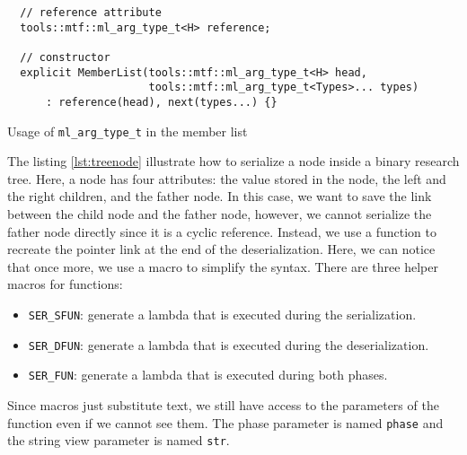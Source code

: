 \begin{listing}[ht!]
\begin{verbatim}
  // reference attribute
  tools::mtf::ml_arg_type_t<H> reference;

  // constructor
  explicit MemberList(tools::mtf::ml_arg_type_t<H> head,
                      tools::mtf::ml_arg_type_t<Types>... types)
      : reference(head), next(types...) {}
\end{verbatim}
\caption{Usage of \texttt{ml\_arg\_type\_t} in the member list}
\label{lst:mlargtype}
\end{listing}

The listing \ref{lst:treenode} illustrate how to serialize a node inside a
binary research tree. Here, a node has four attributes: the value stored in the
node, the left and the right children, and the father node. In this case, we
want to save the link between the child node and the father node, however, we
cannot serialize the father node directly since it is a cyclic reference.
Instead, we use a function to recreate the pointer link at the end of the
deserialization. Here, we can notice that once more, we use a macro to simplify
the syntax. There are three helper macros for functions:

\begin{itemize}
  \item \texttt{SER\_SFUN}: generate a lambda that is executed during the
    serialization.
  \item \texttt{SER\_DFUN}: generate a lambda that is executed during the
    deserialization.
  \item \texttt{SER\_FUN}: generate a lambda that is executed during both
    phases.
\end{itemize}

Since macros just substitute text, we still have access to the parameters of the
function even if we cannot see them. The phase parameter is named \texttt{phase}
and the string view parameter is named \texttt{str}.

